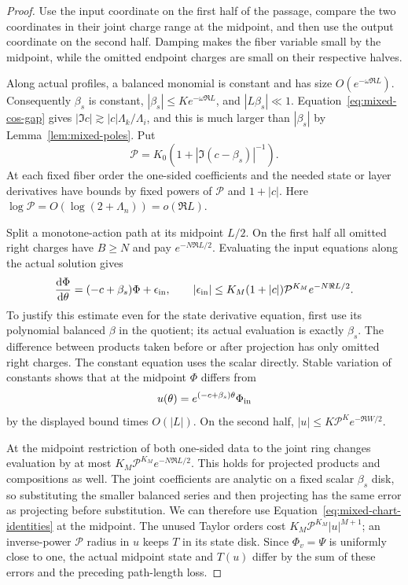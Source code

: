 \begin{proof}
Use the input coordinate on the first half of the passage, compare the
two coordinates in their joint charge range at the midpoint, and then
use the output coordinate on the second half. Damping makes the fiber
variable small by the midpoint, while the omitted endpoint charges are
small on their respective halves.

Along actual profiles, a balanced monomial is constant and has
size $O(e^{-\omega\Re L})$. Consequently $\beta_s$ is constant,
$|\beta_s|\leq K e^{-\omega\Re L}$, and $|L\beta_s|\ll1$.
Equation~\eqref{eq:mixed-cos-gap} gives
$|\Im c|\gtrsim |c|\Lambda_k/\Lambda_i$, and this is much larger
than $|\beta_s|$ by Lemma~\ref{lem:mixed-poles}. Put
\[
 \mathcal P=K_0\left(1+|\Im(c-\beta_s)|^{-1}\right).
\]
At each fixed fiber order the one-sided coefficients and the
needed state or layer derivatives have bounds by fixed powers of
$\mathcal P$ and $1+|c|$. Here
$\log\mathcal P=O(\log(2+\Lambda_n))=o(\Re L)$.

Split a monotone-action path at its midpoint $L/2$. On the first
half all omitted right charges have $B\geq N$ and pay
$e^{-N\Re L/2}$. Evaluating the input equations along the actual
solution gives
\[
 \frac{\mathrm{d}\Phi}{\mathrm{d}\theta}
       =(-c+\beta_s)\Phi+\epsilon_{\rm in},\qquad
 |\epsilon_{\rm in}|\leq
 K_M(1+|c|)\mathcal P^{K_M}e^{-N\Re L/2}.
\]
To justify this estimate even for the state derivative equation,
first use its polynomial balanced $\beta$ in the quotient; its
actual evaluation is exactly $\beta_s$. The difference between
products taken before or after projection has only omitted right
charges. The constant equation uses the scalar directly.
Stable variation of constants shows that at the midpoint $\Phi$
differs from
\[
 u(\theta)=e^{(-c+\beta_s)\theta}\Phi_{\rm in}
\]
by the displayed bound times $O(|L|)$. On the second half,
$|u|\leq K\mathcal P^K e^{-\Re W/2}$.

At the midpoint restriction of both one-sided data to the joint
ring changes evaluation by at most
$K_M\mathcal P^{K_M}e^{-N\Re L/2}$. This holds for projected
products and compositions as well. The joint coefficients are
analytic on a fixed scalar $\beta_s$ disk, so substituting the
smaller balanced series and then projecting has the same error
as projecting before substitution. We can therefore use
Equation~\eqref{eq:mixed-chart-identities} at the midpoint.
The unused Taylor orders cost
$K_M\mathcal P^{K_M}|u|^{M+1}$; an inverse-power
$\mathcal P$ radius in $u$ keeps $T$ in its state disk. Since
$\Phi_v=\Psi$ is uniformly close to one, the actual midpoint
state and $T(u)$ differ by the sum of these errors and the
preceding path-length loss.


\end{proof}
